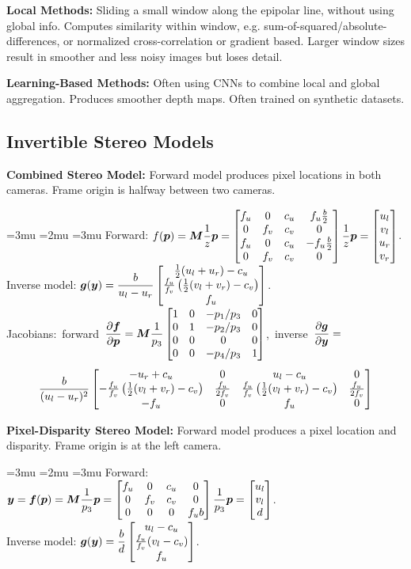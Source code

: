 \documentclass[twocolumn, 10pt]{extarticle}
\begin{document}
\textbf{Local Methods:} Sliding a small window along the epipolar line, without using global info. Computes similarity
within window, e.g. sum-of-squared/absolute-differences, or normalized cross-correlation or gradient based. Larger
window sizes result in smoother and less noisy images but loses detail.

\textbf{Learning-Based Methods:} Often using CNNs to combine local and global aggregation. Produces smoother depth maps.
Often trained on synthetic datasets.

\subsection{Invertible Stereo Models}

\textbf{Combined Stereo Model:} Forward model produces pixel locations in both cameras. Frame origin is halfway between
two cameras.

\begingroup
\thinmuskip=3mu       %
\medmuskip=2mu        %
\thickmuskip=3mu      %
Forward: \(\displaystyle f(\bm p) = \bm M\frac{1}{z}\bm p = \matfour{f_u}{0}{c_u}{f_u\frac{b}{2}}{0}{f_v}{c_v}{0}{f_u}{0}{c_u}{-f_u\frac{b}{2}}{0}{f_v}{c_v}{0}\frac{1}{z}\bm p = \cvec{u_l}{v_l}{u_r}{v_r}\). \\
\endgroup
Inverse model: \(\displaystyle \bm g(\bm y) = {\displaystyle\frac{b}{u_l - u_r}}\cvec{\frac{1}{2}(u_l + u_r) - c_u}{\frac{f_u}{f_v}\left(\frac{1}{2}(v_l + v_r) - c_v\right)}{f_u}\). \\
\mbox{Jacobians: forward \(\displaystyle\pdiff{\bm f}{\bm p} = \bm M\frac{1}{p_3}\matfour{1}{0}{-{p_1}/{p_3}}{0}{0}{1}{-{p_2}/{p_3}}{0}{0}{0}{0}{0}{0}{0}{-{p_4}/{p_3}}{1}\),
inverse \(\displaystyle\frac{\partial\bm g}{\partial\bm y} =\)}\\ %
\begingroup
\setlength{\arraycolsep}{2pt} 
\[\frac{b}{(u_l - u_r)^2}\mat{\mrow{-u_r + c_u}{0}{u_l - c_u}{0}\mrow{-\frac{f_u}{f_v}\left(\frac{1}{2}(v_l + v_r) - c_v\right)}{\frac{f_u}{2f_v}}{\frac{f_u}{f_v}\left(\frac{1}{2}(v_l + v_r) - c_v\right)}{\frac{f_u}{2f_v}}\mrow{-f_u}{0}{f_u}{0}}\]
\endgroup

\textbf{Pixel-Disparity Stereo Model:} Forward model produces a pixel location and disparity. Frame origin is at the
left camera.

\begingroup
\thinmuskip=3mu       %
\medmuskip=2mu        %
\thickmuskip=3mu      %
Forward: \(\displaystyle \bm y = \bm f(\bm p) = \bm M\frac{1}{p_3}\bm p = \mat{\mrow{f_u}{0}{c_u}{0}\mrow{0}{f_v}{c_v}{0}\mrow{0}{0}{0}{f_ub}}\frac{1}{p_3}\bm p = \cvec{u_l}{v_l}{d}\). \\
\endgroup
Inverse model: \(\displaystyle \bm g(\bm y) = \frac{b}{d}\cvec{u_l - c_u}{\frac{f_u}{f_v}(v_l - c_v)}{f_u}\).
\end{document}
